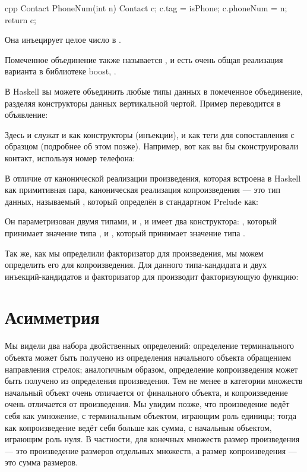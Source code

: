 \begin{snip}{cpp}
Contact PhoneNum(int n) {
    Contact c;
    c.tag = isPhone;
    c.phoneNum = n;
    return c;
}
\end{snip}
Она инъецирует целое число в .

Помеченное объединение также называется , и есть очень
общая реализация варианта в библиотеке boost,
.

В Haskell вы можете объединить любые типы данных в помеченное объединение,
разделяя конструкторы данных вертикальной чертой. Пример 
переводится в объявление:

Здесь  и  служат и как
конструкторы (инъекции), и как теги для сопоставления с образцом (подробнее об
этом позже). Например, вот как вы бы сконструировали контакт,
используя номер телефона:

В отличие от канонической реализации произведения, которая встроена в
Haskell как примитивная пара, каноническая реализация
копроизведения --- это тип данных, называемый , который определён в
стандартном Prelude как:

Он параметризован двумя типами,  и , и имеет два
конструктора: , который принимает значение типа , и
, который принимает значение типа .

Так же, как мы определили факторизатор для произведения, мы можем определить его
для копроизведения. Для данного типа-кандидата  и двух инъекций-кандидатов
 и  факторизатор для 
производит факторизующую функцию:


\section{Асимметрия}

Мы видели два набора двойственных определений: определение терминального
объекта может быть получено из определения начального объекта
обращением направления стрелок; аналогичным образом, определение
копроизведения может быть получено из определения произведения. Тем не менее в
категории множеств начальный объект очень отличается от финального
объекта, и копроизведение очень отличается от произведения. Мы увидим позже,
что произведение ведёт себя как умножение, с терминальным объектом,
играющим роль единицы; тогда как копроизведение ведёт себя больше как сумма,
с начальным объектом, играющим роль нуля. В частности, для
конечных множеств размер произведения --- это произведение размеров
отдельных множеств, а размер копроизведения --- это сумма размеров.

